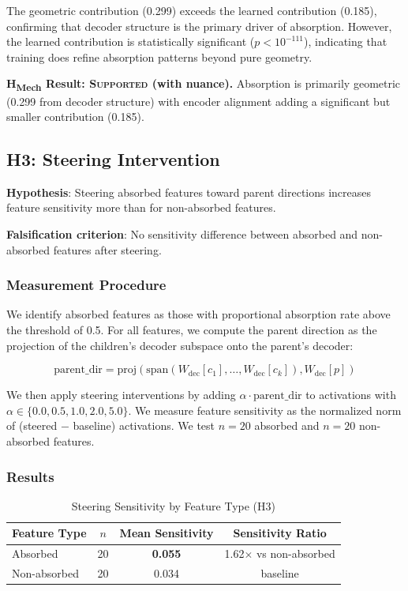 \documentclass{article}
\begin{document}
The geometric contribution (0.299) exceeds the learned contribution (0.185), confirming that decoder structure is the primary driver of absorption. However, the learned contribution is statistically significant ($p < 10^{-111}$), indicating that training does refine absorption patterns beyond pure geometry.

\textbf{H\textsubscript{Mech} Result: \textsc{Supported} (with nuance).} Absorption is primarily geometric (0.299 from decoder structure) with encoder alignment adding a significant but smaller contribution (0.185).

\subsection{H3: Steering Intervention}

\textbf{Hypothesis}: Steering absorbed features toward parent directions increases feature sensitivity more than for non-absorbed features.

\textbf{Falsification criterion}: No sensitivity difference between absorbed and non-absorbed features after steering.

\subsubsection{Measurement Procedure}

We identify absorbed features as those with proportional absorption rate above the threshold of 0.5. For all features, we compute the parent direction as the projection of the children's decoder subspace onto the parent's decoder:

\begin{equation}
\text{parent\_dir} = \text{proj}(\text{span}(W_{\text{dec}}[c_1], \ldots, W_{\text{dec}}[c_k]), W_{\text{dec}}[p])
\end{equation}

We then apply steering interventions by adding $\alpha \cdot \text{parent\_dir}$ to activations with $\alpha \in \{0.0, 0.5, 1.0, 2.0, 5.0\}$. We measure feature sensitivity as the normalized norm of (steered $-$ baseline) activations. We test $n=20$ absorbed and $n=20$ non-absorbed features.

\subsubsection{Results}

\begin{table}[t]
\caption{Steering Sensitivity by Feature Type (H3)}
\label{tab:h3_results}
\centering
\begin{tabular}{lccc}
\toprule
Feature Type & $n$ & Mean Sensitivity & Sensitivity Ratio \\
\midrule
Absorbed & 20 & \textbf{0.055} & 1.62$\times$ vs non-absorbed \\
Non-absorbed & 20 & 0.034 & baseline \\
\bottomrule
\end{tabular}
\end{table}
\end{document}
